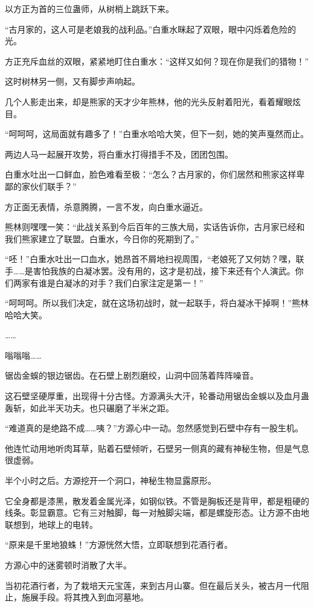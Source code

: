 \begin{this_body}
以方正为首的三位蛊师，从树梢上跳跃下来。

“古月家的，这人可是老娘我的战利品。”白重水眯起了双眼，眼中闪烁着危险的光。

方正充斥血丝的双眼，紧紧地盯住白重水：“这样又如何？现在你是我们的猎物！”

这时树林另一侧，又有脚步声响起。

几个人影走出来，却是熊家的天才少年熊林，他的光头反射着阳光，看着耀眼炫目。

“呵呵呵，这局面就有趣多了！”白重水哈哈大笑，但下一刻，她的笑声戛然而止。

两边人马一起展开攻势，将白重水打得措手不及，团团包围。

白重水吐出一口鲜血，脸色难看至极：“怎么？古月家的，你们居然和熊家这样卑鄙的家伙们联手？”

方正面无表情，杀意腾腾，一言不发，向白重水逼近。

熊林则嘿嘿一笑：“此战关系到今后百年的三族大局，实话告诉你，古月家已经和我们熊家建立了联盟。白重水，今日你的死期到了。”

“呸！”白重水吐出一口血水，她昂首不屑地扫视周围，“老娘死了又何妨？嘿，联手……是害怕我族的白凝冰罢。没有用的，这才是初战，接下来还有个人演武。你们两家有谁是白凝冰的对手？我们白家注定是第一！”

“呵呵呵。所以我们决定，就在这场初战时，就一起联手，将白凝冰干掉啊！”熊林哈哈大笑。

……

嗡嗡嗡……

锯齿金蜈的银边锯齿。在石壁上剧烈磨绞，山洞中回荡着阵阵噪音。

这石壁坚硬厚重，出现得十分古怪。方源满头大汗，轮番动用锯齿金蜈以及血月蛊轰斩，如此半天功夫。也只碾磨了半米之距。

“难道真的是绝路不成……咦？”方源心中一动。忽然感觉到石壁中存有一股生机。

他连忙动用地听肉耳草，贴着石壁倾听，石壁另一侧真的藏有神秘生物，但是气息很虚弱。

半个小时之后。方源挖开一个洞口，神秘生物显露原形。

它全身都是漆黑，散发着金属光泽，如钢似铁。不管是胸板还是背甲，都是粗硬的线条。彰显霸意。它有三对触脚，每一对触脚尖端，都是螺旋形态。让方源不由地联想到，地球上的电转。

“原来是千里地狼蛛！”方源恍然大悟，立即联想到花酒行者。

方源心中的迷雾顿时消散了大半。

当初花酒行者，为了栽培天元宝莲，来到古月山寨。但在最后关头，被古月一代阻止，施展手段。将其拽入到血河墓地。


\end{this_body}
